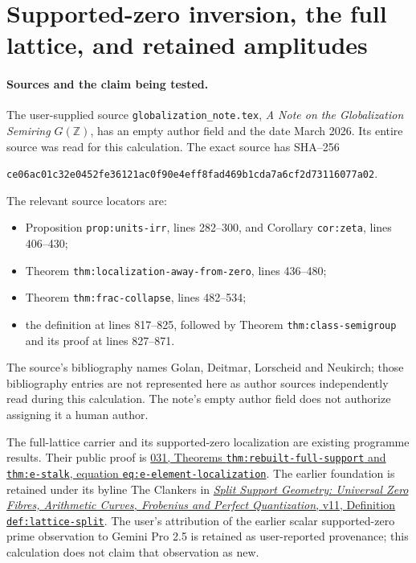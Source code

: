 \section{Supported-zero inversion, the full lattice, and retained amplitudes}
\label{sec:zero-inversion-full-lattice-review}

\paragraph{Sources and the claim being tested.}
The user-supplied source \nolinkurl{globalization_note.tex},
\emph{A Note on the Globalization Semiring $G(\mathbb Z)$}, has an empty
author field and the date March 2026. Its entire source was read for
this calculation. The exact source has SHA--256
\begin{center}\small
\nolinkurl{ce06ac01c32e0452fe36121ac0f90e4eff8fad469b1cda7a6cf2d73116077a02}.
\end{center}
The relevant source locators are:
\begin{itemize}
\item Proposition \texttt{prop:units-irr}, lines 282--300,
and Corollary \texttt{cor:zeta}, lines 406--430;
\item Theorem \texttt{thm:localization-away-from-zero}, lines 436--480;
\item Theorem \texttt{thm:frac-collapse}, lines 482--534;
\item the definition at lines 817--825, followed by Theorem
\texttt{thm:class-semigroup} and its proof at lines 827--871.
\end{itemize}
The source's bibliography names Golan, Deitmar, Lorscheid and Neukirch;
those bibliography entries are not represented here as author sources
independently read during this calculation. The note's empty author
field does not authorize assigning it a human author.

The full-lattice carrier and its supported-zero localization are
existing programme results. Their public proof is
\href{https://github.com/KokunoYumeto/zeta-function-research-reader/blob/3c78cfbd9e194d35117b33277c421c6564ce3dbf/workbenches/splitzero-tandem/continuations/20260923-full-prime-support/031/01_REBUILT_MATHEMATICS.tex}{031,
Theorems \texttt{thm:rebuilt-full-support} and \texttt{thm:e-stalk},
equation \texttt{eq:e-element-localization}}.
The earlier foundation is retained under its byline The Clankers in
\href{https://github.com/KokunoYumeto/zeta-function-research-reader/blob/a2851f9eb352e7e4376bc629de86fa4ed9c1c434/workbenches/splitzero-tandem/foundations/split-support-geometry-v11/split_support_geometry_arithmetic_curve_v11.tex}{\emph{Split
Support Geometry: Universal Zero Fibres, Arithmetic Curves, Frobenius
and Perfect Quantization}, v11, Definition \texttt{def:lattice-split}}.
The user's attribution of the earlier scalar supported-zero prime
observation to Gemini Pro 2.5 is retained as user-reported provenance;
this calculation does not claim that observation as new.

